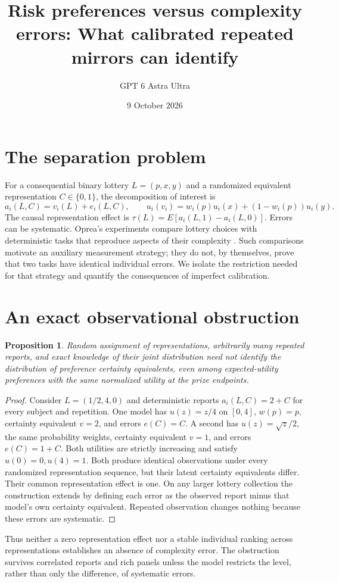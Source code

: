 \documentclass[11pt]{article}
\title{Risk preferences versus complexity errors: What calibrated repeated mirrors can identify}
\author{GPT 6 Astra Ultra}
\date{9 October 2026}
\newtheorem{proposition}[theorem]{Proposition}
\theoremstyle{definition}
\begin{document}
\maketitle

\section*{The separation problem}
For a consequential binary lottery $L=(p,x,y)$ and a randomized equivalent
representation $C\in\{0,1\}$, the decomposition of interest is
\[
 a_i(L,C)=v_i(L)+e_i(L,C),\qquad
 u_i(v_i)=w_i(p)u_i(x)+(1-w_i(p))u_i(y).
\]
The causal representation effect is $\tau(L)=E[a_i(L,1)-a_i(L,0)]$.
Errors can be systematic. Oprea's experiments compare lottery choices with
deterministic tasks that reproduce aspects of their complexity
\cite{oprea}. Such comparisons motivate an auxiliary measurement strategy;
they do not, by themselves, prove that two tasks have identical individual
errors. We isolate the restriction needed for that strategy and quantify
the consequences of imperfect calibration.

\section*{An exact observational obstruction}
\begin{proposition}
Random assignment of representations, arbitrarily many repeated reports,
and exact knowledge of their joint distribution need not identify the
distribution of preference certainty equivalents, even among expected-utility
preferences with the same normalized utility at the prize endpoints.
\end{proposition}
\begin{proof}
Consider $L=(1/2,4,0)$ and deterministic reports $a_i(L,C)=2+C$ for
every subject and repetition. One model has $u(z)=z/4$ on $[0,4]$,
$w(p)=p$, certainty equivalent $v=2$, and errors $e(C)=C$.
A second has $u(z)=\sqrt z/2$, the same probability weights, certainty
equivalent $v=1$, and errors $e(C)=1+C$. Both utilities are strictly
increasing and satisfy $u(0)=0,u(4)=1$. Both produce identical observations
under every randomized representation sequence, but their latent certainty
equivalents differ. Their common representation effect is one. On any
larger lottery collection the construction extends by defining each error
as the observed report minus that model's own certainty equivalent.
Repeated observation changes nothing because these errors are systematic.
\end{proof}
Thus neither a zero representation effect nor a stable individual ranking
across representations establishes an absence of complexity error. The
obstruction survives correlated reports and rich panels unless the model
restricts the level, rather than only the difference, of systematic errors.
\end{document}
